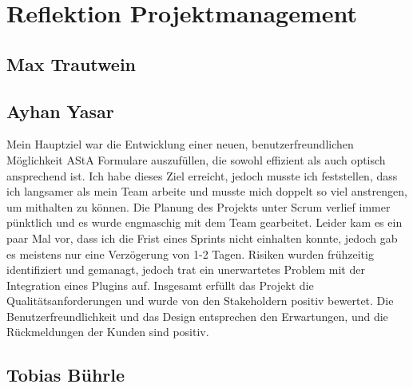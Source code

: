 \chapter{Reflektion Projektmanagement}\label{ch:reflektion-projektmanagement}


\section{Max Trautwein}


\section{Ayhan Yasar}
Mein Hauptziel war die Entwicklung einer neuen, benutzerfreundlichen Möglichkeit AStA Formulare auszufüllen, die sowohl effizient als auch optisch ansprechend ist. 
Ich habe dieses Ziel erreicht, jedoch musste ich feststellen, dass ich langsamer als mein Team arbeite und musste mich doppelt so viel anstrengen, um mithalten zu können.
Die Planung des Projekts unter Scrum verlief immer pünktlich und es wurde engmaschig mit dem Team gearbeitet. Leider kam es ein paar Mal vor, dass ich die Frist eines Sprints nicht einhalten konnte, 
jedoch gab es meistens nur eine Verzögerung von 1-2 Tagen. 
Risiken wurden frühzeitig identifiziert und gemanagt, jedoch trat ein unerwartetes Problem mit der Integration eines Plugins auf.
Insgesamt erfüllt das Projekt die Qualitätsanforderungen und wurde von den Stakeholdern positiv bewertet. Die Benutzerfreundlichkeit und das Design entsprechen den Erwartungen, und die Rückmeldungen der Kunden sind positiv.


\section{Tobias Bührle}

